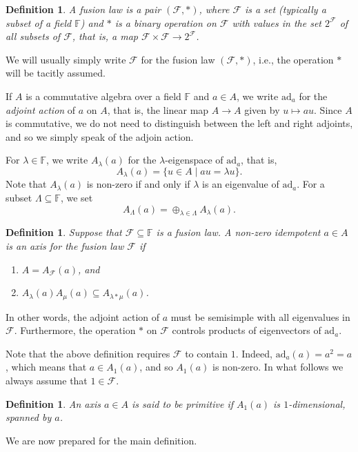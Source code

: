 \documentclass[12pt]{article}
\newtheorem{definition}[theorem]{Definition}
\newcommand\F{\mathbb{F}}
\newcommand\cF{\mathcal{F}}
\newcommand\lm{\lambda}
\newcommand\Lm{\Lambda}
\newcommand\ad{\mathrm{ad}}
\begin{document}
\begin{definition}
A \emph{fusion law} is a pair $(\cF,\ast)$, where $\cF$ is a set (typically a subset 
of a field $\F$) and $\ast$ is a binary operation on $\cF$ with values in the set 
$2^{\cF}$ of all subsets of $\cF$, that is, a map $\cF\times\cF\to 2^{\cF}$. 
\end{definition}

We will usually simply write $\cF$ for the fusion law $(\cF,\ast)$, i.e., the operation $\ast$ will be tacitly assumed.

If $A$ is a commutative algebra over a field $\F$ and $a\in A$, we write $\ad_a$ 
for the \emph{adjoint action} of $a$ on $A$, that is, the linear map $A\to A$ given 
by $u\mapsto au$. Since $A$ is commutative, we do not need to distinguish between the 
left and right adjoints, and so we simply speak of the adjoin action.

For $\lm\in\F$, we write $A_\lm(a)$ for the $\lm$-eigenspace of $\ad_a$, that is, 
%
$$
A_\lm(a)=\{u\in A\mid au=\lm u\}.
$$
%
Note that $A_\lm(a)$ is non-zero if and only if $\lm$ is an eigenvalue of $\ad_a$. 
For a subset $\Lm\subseteq\F$, we set 
%
$$
A_\Lm(a)=\oplus_{\lm\in\Lm}A_\lm(a).
$$

\begin{definition}
Suppose that $\cF\subseteq\F$ is a fusion law. A non-zero idempotent $a\in A$ is an 
\emph{axis} for the fusion law $\cF$ if 
%
\begin{enumerate}
\item[(a)] $A=A_\cF(a)$, and
\item[(b)] $A_\lm(a)A_\mu(a)\subseteq A_{\lm\ast\mu}(a)$.
\end{enumerate}
\end{definition}

In other words, the adjoint action of $a$ must be semisimple with all eigenvalues in 
$\cF$. Furthermore, the operation $\ast$ on $\cF$ controls products of eigenvectors 
of $\ad_a$.

Note that the above definition requires $\cF$ to contain $1$. Indeed, 
$\ad_a(a)=a^2=a$, which means that $a\in A_1(a)$, and so $A_1(a)$ is non-zero. In 
what follows we always assume that $1\in\cF$.

\begin{definition}
An axis $a\in A$ is said to be \emph{primitive} if $A_1(a)$ is $1$-dimensional, 
spanned by $a$.
\end{definition}

We are now prepared for the main definition.
\end{document}
